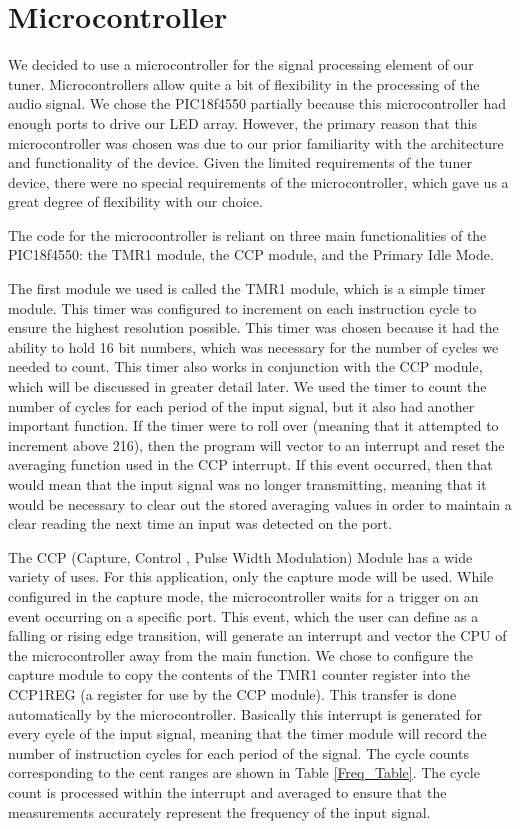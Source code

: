 \documentclass[12pt]{article}
\begin{document}
\section{Microcontroller}
We decided to use a microcontroller for the signal processing element of our tuner. Microcontrollers
allow quite a bit of flexibility in the processing of the audio signal. We chose the PIC18f4550 partially
because this microcontroller had enough ports to drive our LED array. However, the primary reason
that this microcontroller was chosen was due to our prior familiarity with the architecture and
functionality of the device. Given the limited requirements of the tuner device, there were no special
requirements of the microcontroller, which gave us a great degree of flexibility with our choice.

The code for the microcontroller is reliant on three main functionalities of the PIC18f4550: the TMR1
module, the CCP module, and the Primary Idle Mode.

The first module we used is called the TMR1 module, which is a simple timer module. This timer was
configured to increment on each instruction cycle to ensure the highest resolution possible. This timer
was chosen because it had the ability to hold 16 bit numbers, which was necessary for the number of
cycles we needed to count. This timer also works in conjunction with the CCP module, which will be
discussed in greater detail later. We used the timer to count the number of cycles for each period of the
input signal, but it also had another important function. If the timer were to roll over (meaning that it
attempted to increment above 216), then the program will vector to an interrupt and reset the averaging
function used in the CCP interrupt. If this event occurred, then that would mean that the input signal
was no longer transmitting, meaning that it would be necessary to clear out the stored averaging values
in order to maintain a clear reading the next time an input was detected on the port.

The CCP (Capture, Control , Pulse Width Modulation) Module has a wide variety of uses. For
this application, only the capture mode will be used. While configured in the capture mode, the
microcontroller waits for a trigger on an event occurring on a specific port. This event, which
the user can define as a falling or rising edge transition, will generate an interrupt and vector the CPU of
the microcontroller away from the main function. We chose to configure the capture module to copy
the contents of the TMR1 counter register into the CCP1REG (a register for use by the CCP module).
This transfer is done automatically by the microcontroller. Basically this interrupt is generated for every
cycle of the input signal, meaning that the timer module will record the number of instruction cycles
for each period of the signal. The cycle counts corresponding to the cent ranges are shown in Table
\ref{Freq_Table}. The cycle count is processed within the interrupt and averaged to ensure that the measurements
accurately represent the frequency of the input signal.
\end{document}

